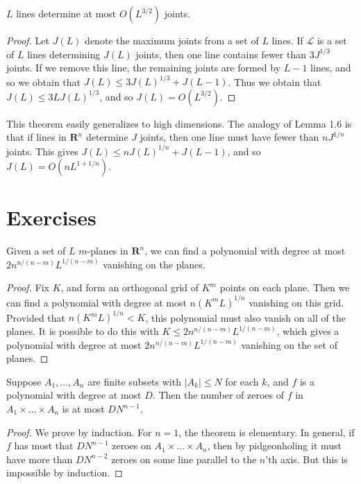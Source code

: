 \begin{theorem}
	$L$ lines determine at most $O(L^{3/2})$ joints.
\end{theorem}
\begin{proof}
	Let $J(L)$ denote the maximum joints from a set of $L$ lines. If $\mathcal{L}$ is a set of $L$ lines determining $J(L)$ joints, then one line contains fewer than $3J^{1/3}$ joints. If we remove this line, the remaining joints are formed by $L-1$ lines, and so we obtain that $J(L) \leq 3J(L)^{1/3} + J(L-1)$. Thus we obtain that $J(L) \leq 3L J(L)^{1/3}$, and so $J(L) = O(L^{3/2})$.
\end{proof}

This theorem easily generalizes to high dimensions. The analogy of Lemma 1.6 is that if lines in $\mathbf{R}^n$ determine $J$ joints, then one line must have fewer than $nJ^{1/n}$ joints. This gives $J(L) \leq nJ(L)^{1/n} + J(L-1)$, and so $J(L) = O(n L^{1 + 1/n})$.

\section{Exercises}

\begin{theorem}
	Given a set of $L$ $m$-planes in $\mathbf{R}^n$, we can find a polynomial with degree at most $2n^{n/(n-m)} L^{1/(n-m)}$ vanishing on the planes.
\end{theorem}
\begin{proof}
	Fix $K$, and form an orthogonal grid of $K^m$ points on each plane. Then we can find a polynomial with degree at most $n(K^m L)^{1/n}$ vanishing on this grid. Provided that $n(K^m L)^{1/n} < K$, this polynomial must also vanish on all of the planes. It is possible to do this with $K \leq 2n^{n/(n-m)} L^{1/(n-m)}$, which gives a polynomial with degree at most $2n^{n/(n-m)} L^{1/(n-m)}$ vanishing on the set of planes.
\end{proof}

\begin{theorem}
	Suppose $A_1, \dots, A_n$ are finite subsets with $|A_k| \leq N$ for each $k$, and $f$ is a polynomial with degree at most $D$. Then the number of zeroes of $f$ in $A_1 \times \dots \times A_n$ is at most $DN^{n-1}$.
\end{theorem}
\begin{proof}
	We prove by induction. For $n = 1$, the theorem is elementary. In general, if $f$ has most that $DN^{n-1}$ zeroes on $A_1 \times \dots \times A_n$, then by pidgeonholing it must have more than $DN^{n-2}$ zeroes on some line parallel to the $n$'th axis. But this is impossible by induction.
\end{proof}


